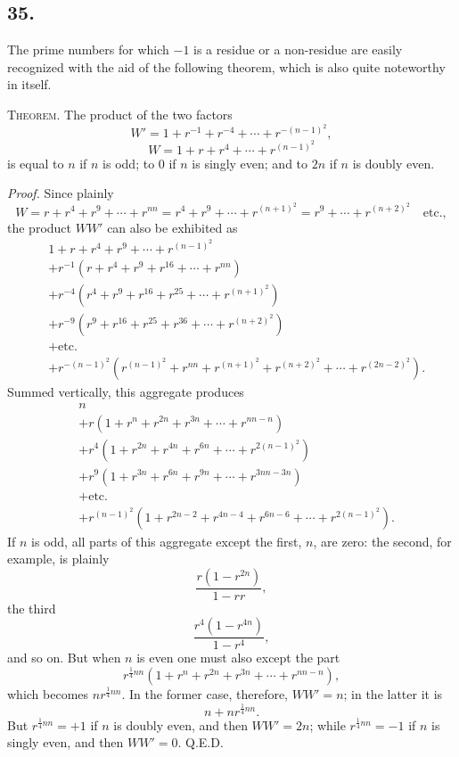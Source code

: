 \documentclass[12pt]{article}
\begin{document}
\subsection*{35.}

The prime numbers for which $-1$ is a residue or a non-residue are easily recognized with the aid of the following theorem, which is also quite noteworthy in itself.

\textsc{Theorem.} The product of the two factors
\[
W'=1+r^{-1}+r^{-4}+\cdots+r^{-(n-1)^2},
\]
\[
W=1+r+r^4+\cdots+r^{(n-1)^2}
\]
is equal to $n$ if $n$ is odd; to $0$ if $n$ is singly even; and to $2n$ if $n$ is doubly even.

\emph{Proof.} Since plainly
\[
W=r+r^4+r^9+\cdots+r^{nn}
=r^4+r^9+\cdots+r^{(n+1)^2}
=r^9+\cdots+r^{(n+2)^2}\quad\text{etc.},
\]
the product $WW'$ can also be exhibited as
\[
\begin{aligned}
&1+r+r^4+r^9+\cdots+r^{(n-1)^2}\\
&+r^{-1}(r+r^4+r^9+r^{16}+\cdots+r^{nn})\\
&+r^{-4}(r^4+r^9+r^{16}+r^{25}+\cdots+r^{(n+1)^2})\\
&+r^{-9}(r^9+r^{16}+r^{25}+r^{36}+\cdots+r^{(n+2)^2})\\
&+\text{etc.}\\
&+r^{-(n-1)^2}(r^{(n-1)^2}+r^{nn}+r^{(n+1)^2}+r^{(n+2)^2}+\cdots+r^{(2n-2)^2}).
\end{aligned}
\]
Summed vertically, this aggregate produces
\[
\begin{aligned}
&n\\
&+r(1+r^n+r^{2n}+r^{3n}+\cdots+r^{nn-n})\\
&+r^4(1+r^{2n}+r^{4n}+r^{6n}+\cdots+r^{2(n-1)^2})\\
&+r^9(1+r^{3n}+r^{6n}+r^{9n}+\cdots+r^{3nn-3n})\\
&+\text{etc.}\\
&+r^{(n-1)^2}(1+r^{2n-2}+r^{4n-4}+r^{6n-6}+\cdots+r^{2(n-1)^2}).
\end{aligned}
\]
If $n$ is odd, all parts of this aggregate except the first, $n$, are zero: the second, for example, is plainly
\[
\frac{r(1-r^{2n})}{1-rr},
\]
the third
\[
\frac{r^4(1-r^{4n})}{1-r^4},
\]
and so on. But when $n$ is even one must also except the part
\[
r^{\frac14 nn}(1+r^n+r^{2n}+r^{3n}+\cdots+r^{nn-n}),
\]
which becomes $nr^{\frac14 nn}$. In the former case, therefore, $WW'=n$; in the latter it is
\[
n+nr^{\frac14 nn}.
\]
But $r^{\frac14 nn}=+1$ if $n$ is doubly even, and then $WW'=2n$; while $r^{\frac14 nn}=-1$ if $n$ is singly even, and then $WW'=0$. Q.E.D.
\end{document}
